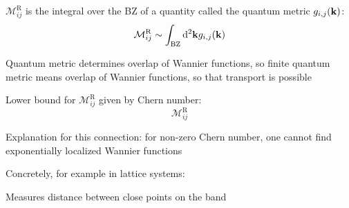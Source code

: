 \documentclass[aspectratio=169]{beamer}
\begin{document}
\begin{frame}
	\(\mathcal{M}_{ij}^{\textrm{R}}\) is the integral over the BZ of a quantity called the quantum metric \(g_{i, j} (\mathbf{k})\):
	\begin{equation}
		\mathcal{M}_{ij}^{\textrm{R}} \sim \int_{\textrm{BZ}} \odif[order=2]{\vb{k}} g_{i, j} (\vb{k})
	\end{equation}
	
	Quantum metric determines overlap of Wannier functions, so finite quantum metric means overlap of Wannier functions, so that transport is possible
	
	Lower bound for \(\mathcal{M}_{ij}^{\textrm{R}}\) given by Chern number:
	\begin{equation}
		\mathcal{M}_{ij}^{\textrm{R}}
	\end{equation}
	
	Explanation for this connection: for non-zero Chern number, one cannot find exponentially localized Wannier functions
\end{frame}

\begin{frame}
	Concretely, for example in lattice systems:
	
	Measures distance between close points on the band 
\end{frame}
\end{document}
